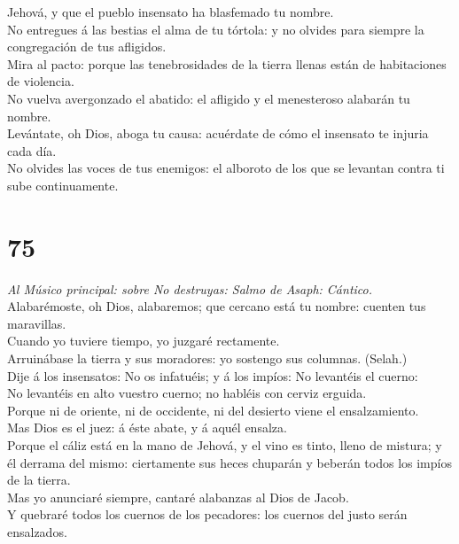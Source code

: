 Jehová, y que el pueblo insensato ha blasfemado tu nombre.\\
 No entregues á las bestias el alma de tu tórtola: y no
olvides para siempre la congregación de tus afligidos.\\
 Mira al pacto: porque las tenebrosidades de la tierra
llenas están de habitaciones de violencia.\\
 No vuelva avergonzado el abatido: el afligido y el
menesteroso alabarán tu nombre.\\
 Levántate, oh Dios, aboga tu causa: acuérdate de cómo el
insensato te injuria cada día.\\
 No olvides las voces de tus enemigos: el alboroto de los
que se levantan contra ti sube continuamente.

\hypertarget{section-74}{%
\section{75}\label{section-74}}

 \emph{Al Músico principal: sobre No destruyas: Salmo de
Asaph: Cántico.}\\
Alabarémoste, oh Dios, alabaremos; que cercano está tu nombre: cuenten
tus maravillas.\\
 Cuando yo tuviere tiempo, yo juzgaré rectamente.\\
 Arruinábase la tierra y sus moradores: yo sostengo sus
columnas. (Selah.)\\
 Dije á los insensatos: No os infatuéis; y á los impíos: No
levantéis el cuerno:\\
 No levantéis en alto vuestro cuerno; no habléis con cerviz
erguida.\\
 Porque ni de oriente, ni de occidente, ni del desierto
viene el ensalzamiento.\\
 Mas Dios es el juez: á éste abate, y á aquél ensalza.\\
 Porque el cáliz está en la mano de Jehová, y el vino es
tinto, lleno de mistura; y él derrama del mismo: ciertamente sus heces
chuparán y beberán todos los impíos de la tierra.\\
 Mas yo anunciaré siempre, cantaré alabanzas al Dios de
Jacob.\\
 Y quebraré todos los cuernos de los pecadores: los cuernos
del justo serán ensalzados.

